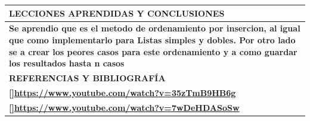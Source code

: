 \documentclass[9pt]{article}
\begin{document}
	\begin{table}[H]
		\begin{tabular}{|p{15cm}|}
			\hline 
			\rowcolor{tablebackground}
			\color{white}\textbf{LECCIONES APRENDIDAS Y CONCLUSIONES}  \\
			\hline 
			\textbf{Se aprendio que es el metodo de ordenamiento por insercion, 
			al igual que como implementarlo para Listas simples y dobles. Por otro lado se
			a crear los peores casos para este ordenamiento y a como guardar los resultados
			hasta n casos }  \\
			\hline 
			\rowcolor{tablebackground}
			\color{white}\textbf{REFERENCIAS Y BIBLIOGRAFÍA}  \\
			\hline 
			\textbf{[]\url{https://www.youtube.com/watch?v=35zTmB9HB6g}}\\
			\textbf{[]\url{https://www.youtube.com/watch?v=7wDeHDASoSw}}\\
			\hline 
		\end{tabular}
	\end{table}
\end{document}
